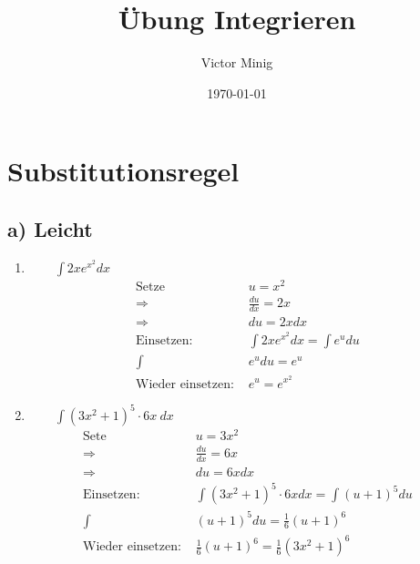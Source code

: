 \documentclass{article}
\begin{document}
\title{Übung Integrieren}
\author{Victor Minig}
\date{\today}
\maketitle

\section*{Substitutionsregel}
\subsection*{a) Leicht}
\begin{enumerate}[label=\roman{enumi}]
    \item $\qquad\int 2x  e^{x^2}dx $   \\
        \begin{align*}
            \text{Setze } &u = x^2 \\
            \Rightarrow ~ &\frac{du}{dx} = 2x \\
            \Rightarrow ~ &du = 2x dx \\
            \text{Einsetzen: }&\int 2x e^{x^2} dx = \int e^u du \\
            \int &e^{u}du = e^{u}\\ 
            \text{Wieder einsetzen: }&e^{u} = e^{x^2} 
        \end{align*}
    \item $\qquad \int (3x^2 + 1)^5 \cdot 6x  ~ dx$ 
        \begin{align*}
            \text{Sete } & u = 3x^2 \\
            \Rightarrow ~ & \frac{du}{dx} = 6x \\
            \Rightarrow ~ & du = 6x dx \\
            \text{Einsetzen: }&\int (3x^2 +1)^5 \cdot 6x dx = \int (u + 1)^5 du \\
            \int &(u + 1)^5 du = \frac{1}{6}(u+1)^6 \\
            \text{Wieder einsetzen: }&\frac{1}{6}(u+1)^6 = \frac{1}{6}(3x^2+1)^6
        \end{align*}
\end{enumerate}
\end{document}
